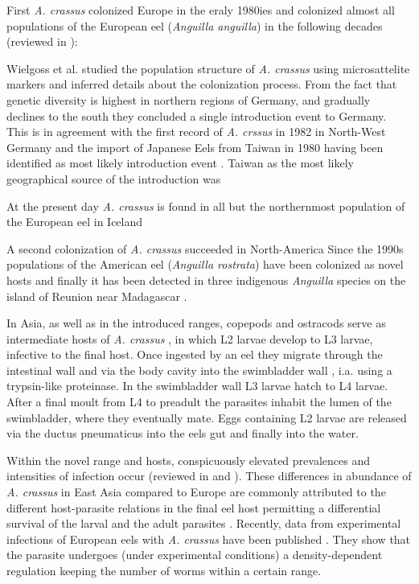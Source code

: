 First \textit{A. crassus} colonized Europe in the eraly 1980ies and
colonized almost all populations of the European eel (\textit{Anguilla
  anguilla}) in the following decades (reviewed in
\cite{kirk_impact_2003}):

Wielgoss et al. \cite{wielgoss_population_2008} studied the population
structure of \textit{A. crassus} using microsattelite markers and
inferred details about the colonization process. From the fact that
genetic diversity is highest in northern regions of Germany, and
gradually declines to the south they concluded a single introduction
event \cite{wielgoss_population_2008} to Germany. This is in agreement
with the first record of \textit{A. crssus} in 1982 in North-West
Germany \cite{fischer_teichwirt} and the import of Japanese Eels from
Taiwan in 1980 having been identified as most likely introduction
event \cite{koops_anguillicola-infestations_1989}. Taiwan as the most
likely geographical source of the introduction was 


At the present day \textit{A. crassus} is found in all but the
northernmost population of the European eel in Iceland
\cite{kristmundsson_parasite_2007}

A second colonization of \textit{A. crassus} succeeded in
North-America Since the 1990s populations of the American eel
(\textit{Anguilla rostrata}) have been colonized as novel hosts
\cite{fries_notes:_1996,barse_exotic_1999, barse_swimbladder_2001} and
finally it has been detected in three indigenous \textit{Anguilla}
species on the island of Reunion near Madagascar
\cite{sasal_parasite_2008}.\

In Asia, as well as in the introduced ranges, copepods and ostracods
serve as intermediate hosts of \textit{A. crassus}
\cite{moravec_first_2005}, in which L2 larvae develop to L3 larvae,
infective to the final host. Once ingested by an eel they migrate
through the intestinal wall and via the body cavity into the
swimbladder wall \cite{haenen_effects_1996}, i.a. using a trypsin-like
proteinase\cite{polzer_identification_1993}. In the swimbladder wall
L3 larvae hatch to L4 larvae. After a final moult from L4 to preadult
the parasites inhabit the lumen of the swimbladder, where they
eventually mate. Eggs containing L2 larvae are released via the ductus
pneumaticus into the eels gut and finally into the
water\cite{de_charleroy_life_1990}.\

Within the novel range and hosts, conspicuously elevated prevalences
and intensities of infection occur (reviewed in
\cite{kirk_impact_2003} and \cite{taraschewski_hosts_2007}). These
differences in abundance of \textit{A. crassus} in East Asia compared
to Europe are commonly attributed to the different host-parasite
relations in the final eel host permitting a differential survival of
the larval and the adult parasites
\cite{knopf_differences_2004}. Recently, data from experimental
infections of European eels with \textit{A. crassus} have been
published \cite{fazio_regulation_2008}. They show that the parasite
undergoes (under experimental conditions) a density-dependent
regulation keeping the number of worms within a certain range.\

